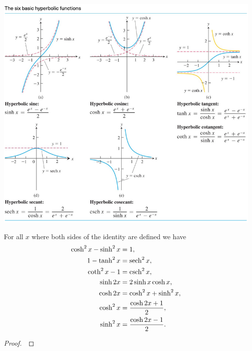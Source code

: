 \newpage

\includegraphics[width=6.5in]{img/hyperbolic_graphs}

\newpage

\begin{theorem}
For all $x$ where both sides of the identity are defined we have 
\begin{align}
\cosh^2 x -\sinh^2 x &= 1,\\
1-\tanh^2x &=\operatorname{sech}^2 x,\\
\coth^2 x -1&=\operatorname{csch}^2 x,\\
\sinh 2x &= 2\sinh x\cosh x,\\
\cosh 2x &=\cosh^2x + \sinh^2 x,\\
\cosh^2 x&=\frac{\cosh 2x + 1}{2},\\
\sinh^2 x&=\frac{\cosh 2x - 1}{2}.
\end{align}
\end{theorem}
\begin{proof}\,

\vspace{5in}
\end{proof}

\newpage

